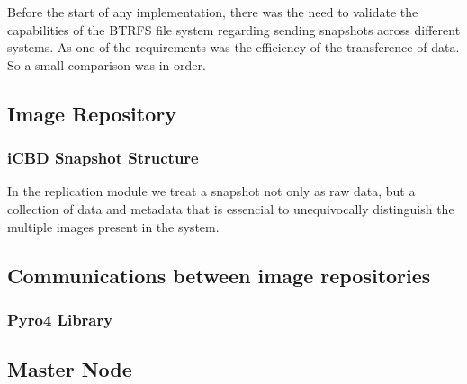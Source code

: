 Before the start of any implementation, there was the need to validate the capabilities of the BTRFS file system regarding sending snapshots across different systems.
As one of the requirements was the efficiency of the transference of data. So a small comparison was in order. 


\subsection{Image Repository}
\label{sub:rep_image_repo}

\subsubsection{iCBD Snapshot Structure}
\label{subsub:icbd_snapshot}

In the replication module we treat a snapshot not only as raw data, but a collection of data and metadata that is essencial to unequivocally distinguish the multiple images present in the system. 


\subsection{Communications between image repositories}
\label{sub:rep_rpcs}


\subsubsection{Pyro4 Library}
\label{subsub:rep_pyro4}



\subsection{Master Node}
\label{sub:rep_master_node}

